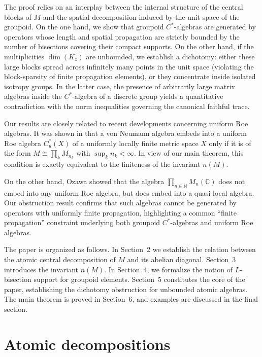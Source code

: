 \medskip

The proof relies on an interplay between the internal structure of the central blocks of $M$ and the spatial decomposition induced by the unit space of the groupoid. On the one hand, we show that groupoid $C^*$-algebras are generated by operators whose length and spatial propagation are strictly bounded by the number of bisections covering their compact supports. On the other hand, if the multiplicities $\dim(K_z)$ are unbounded, we establish a dichotomy: either these large blocks spread across infinitely many points in the unit space (violating the block-sparsity of finite propagation elements), or they concentrate inside isolated isotropy groups. In the latter case, the presence of arbitrarily large matrix algebras inside the $C^*$-algebra of a discrete group yields a quantitative contradiction with the norm inequalities governing the canonical faithful trace.

\medskip

Our results are closely related to recent developments concerning uniform Roe algebras. 
It was shown in \cite{BBFVW} that a von Neumann algebra embeds into a uniform Roe algebra $C_u^*(X)$ of a uniformly locally finite metric space $X$ only if it is of the form
$M \cong \prod_k M_{n_k}$ with $\sup_k n_k < \infty$. In view of our main theorem, this condition is exactly equivalent to the finiteness of the invariant $n(M)$. 

On the other hand, Ozawa \cite{Ozawa2023} showed that the algebra $\prod_{n \in \mathbb{N}} M_n(\mathbb{C})$ does not embed into any uniform Roe algebra, but does embed into a quasi-local algebra. Our obstruction result confirms that such algebras cannot be generated by operators with uniformly finite propagation, highlighting a common ``finite propagation'' constraint underlying both groupoid $C^*$-algebras and uniform Roe algebras.

\medskip

The paper is organized as follows. In Section~2 we establish the relation between the atomic central decomposition of $M$ and its abelian diagonal. Section~3 introduces the invariant $n(M)$. In Section~4, we formalize the notion of $L$-bisection support for groupoid elements. Section~5 constitutes the core of the paper, establishing the dichotomy obstruction for unbounded atomic algebras. The main theorem is proved in Section~6, and examples are discussed in the final section.

\section{Atomic decompositions}

